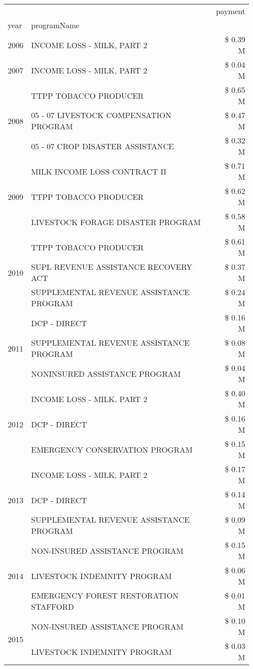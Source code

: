 \begin{tabular}{llr}
\toprule
 &  & payment \\
year & programName &  \\
\midrule
2006 & INCOME LOSS - MILK, PART 2 & \$ 0.39 M \\
\cline{1-3}
2007 & INCOME LOSS - MILK, PART 2 & \$ 0.04 M \\
\cline{1-3}
\multirow[t]{3}{*}{2008} & TTPP TOBACCO PRODUCER & \$ 0.65 M \\
 & 05 - 07 LIVESTOCK COMPENSATION PROGRAM & \$ 0.47 M \\
 & 05 - 07 CROP DISASTER ASSISTANCE & \$ 0.32 M \\
\cline{1-3}
\multirow[t]{3}{*}{2009} & MILK INCOME LOSS CONTRACT II & \$ 0.71 M \\
 & TTPP TOBACCO PRODUCER & \$ 0.62 M \\
 & LIVESTOCK FORAGE DISASTER  PROGRAM & \$ 0.58 M \\
\cline{1-3}
\multirow[t]{3}{*}{2010} & TTPP TOBACCO PRODUCER & \$ 0.61 M \\
 & SUPL REVENUE ASSISTANCE RECOVERY ACT & \$ 0.37 M \\
 & SUPPLEMENTAL REVENUE ASSISTANCE PROGRAM & \$ 0.24 M \\
\cline{1-3}
\multirow[t]{3}{*}{2011} & DCP - DIRECT & \$ 0.16 M \\
 & SUPPLEMENTAL REVENUE ASSISTANCE PROGRAM & \$ 0.08 M \\
 & NONINSURED ASSISTANCE PROGRAM & \$ 0.04 M \\
\cline{1-3}
\multirow[t]{3}{*}{2012} & INCOME LOSS - MILK, PART 2 & \$ 0.40 M \\
 & DCP - DIRECT & \$ 0.16 M \\
 & EMERGENCY CONSERVATION PROGRAM & \$ 0.15 M \\
\cline{1-3}
\multirow[t]{3}{*}{2013} & INCOME LOSS - MILK, PART 2 & \$ 0.17 M \\
 & DCP - DIRECT & \$ 0.14 M \\
 & SUPPLEMENTAL REVENUE ASSISTANCE PROGRAM & \$ 0.09 M \\
\cline{1-3}
\multirow[t]{3}{*}{2014} & NON-INSURED ASSISTANCE PROGRAM & \$ 0.15 M \\
 & LIVESTOCK INDEMNITY PROGRAM & \$ 0.06 M \\
 & EMERGENCY FOREST RESTORATION STAFFORD & \$ 0.01 M \\
\cline{1-3}
\multirow[t]{3}{*}{2015} & NON-INSURED ASSISTANCE PROGRAM & \$ 0.10 M \\
 & LIVESTOCK INDEMNITY PROGRAM & \$ 0.03 M \\

\end{tabular}

